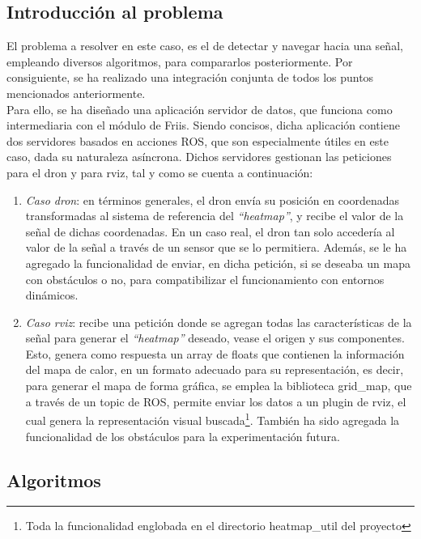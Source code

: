 \subsection{Introducción al problema}
\label{subsec:intro_sf}

El problema a resolver en este caso, es el de detectar y navegar hacia una señal, empleando diversos algoritmos, para compararlos posteriormente. Por consiguiente, se ha realizado una integración conjunta de todos los puntos mencionados anteriormente.\\

Para ello, se ha diseñado una aplicación servidor de datos, que funciona como intermediaria con el módulo de Friis. Siendo concisos, dicha aplicación contiene dos servidores basados en acciones \ac{ROS}, que son especialmente útiles en este caso, dada su naturaleza asíncrona. Dichos servidores gestionan las peticiones para el dron y para rviz, tal y como se cuenta a continuación:

\begin{enumerate}
	\item \emph{Caso dron}: en términos generales, el dron envía su posición en coordenadas transformadas al sistema de referencia del \emph{``heatmap''}, y recibe el valor de la señal de dichas coordenadas. En un caso real, el dron tan solo accedería al valor de la señal a través de un sensor que se lo permitiera. Además, se le ha agregado la funcionalidad de enviar, en dicha petición, si se deseaba un mapa con obstáculos o no, para compatibilizar el funcionamiento con entornos dinámicos.

	\item \emph{Caso rviz}: recibe una petición donde se agregan todas las características de la señal para generar el \emph{``heatmap''} deseado, vease el origen y sus componentes. Esto, genera como respuesta un array de floats que contienen la información del mapa de calor, en un formato adecuado para su representación, es decir, para generar el mapa de forma gráfica, se emplea la biblioteca grid\_map, que a través de un topic de \ac{ROS}, permite enviar los datos a un plugin de rviz, el cual genera la representación visual buscada\footnote[2]{Toda la funcionalidad englobada en el directorio heatmap\_util del proyecto}. También ha sido agregada la funcionalidad de los obstáculos para la experimentación futura.
\end{enumerate}

\subsection{Algoritmos}
\label{subsec:algoritmo_sf}

